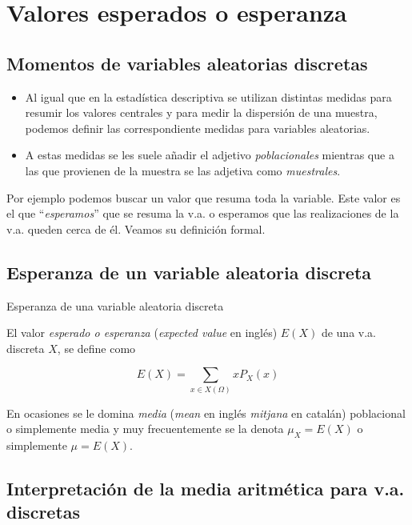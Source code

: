 \documentclass[]{book}
\begin{document}
\hypertarget{valores-esperados-o-esperanza}{%
\section{Valores esperados o esperanza}\label{valores-esperados-o-esperanza}}

\hypertarget{momentos-de-variables-aleatorias-discretas}{%
\subsection{Momentos de variables aleatorias discretas}\label{momentos-de-variables-aleatorias-discretas}}

\begin{itemize}
\item
  Al igual que en la estadística descriptiva se utilizan distintas medidas para
  resumir los valores centrales y para medir la dispersión de una muestra, podemos definir
  las correspondiente medidas para variables aleatorias.
\item
  A estas medidas se les suele añadir el adjetivo \emph{poblacionales} mientras que a las que provienen de la muestra se las adjetiva como \emph{muestrales}.
\end{itemize}

Por ejemplo podemos buscar un valor que resuma toda la variable. Este valor es el que ``\emph{esperamos}'' que se resuma la v.a. o esperamos que las realizaciones de la v.a. queden cerca de él. Veamos su definición formal.

\hypertarget{esperanza-de-un-variable-aleatoria-discreta}{%
\subsection{Esperanza de un variable aleatoria discreta}\label{esperanza-de-un-variable-aleatoria-discreta}}

Esperanza de una variable aleatoria discreta

El valor \emph{esperado o esperanza} (\emph{expected value} en inglés) \(E(X)\) de una v.a. discreta \(X\), se define como

\[
E(X)=\sum_{x\in X(\Omega)} x P_{X}(x)
\]

En ocasiones se le domina \emph{media} (\emph{mean} en inglés \emph{mitjana} en catalán) poblacional o simplemente media y muy frecuentemente se la denota \(\mu_{X}=E(X)\) o simplemente \(\mu=E(X)\).

\hypertarget{interpretaciuxf3n-de-la-media-aritmuxe9tica-para-v.a.-discretas}{%
\subsection{Interpretación de la media aritmética para v.a. discretas}\label{interpretaciuxf3n-de-la-media-aritmuxe9tica-para-v.a.-discretas}}
\end{document}
